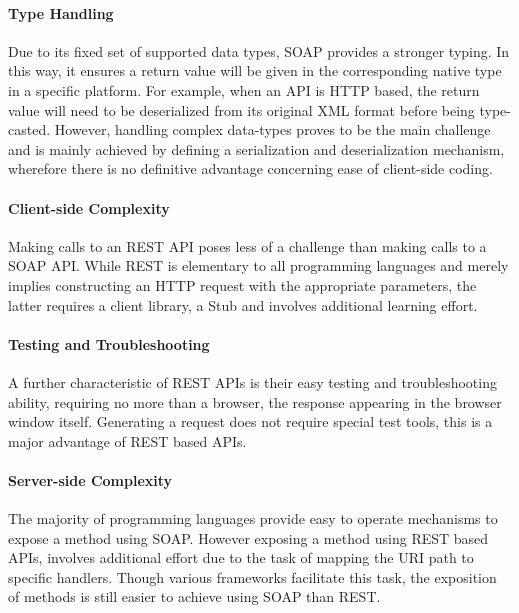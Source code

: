 \paragraph{Type Handling}

Due to its fixed set of supported data types, SOAP provides a stronger typing. In this way, it ensures a return value  will be given in the corresponding native type in a specific platform. For example, when an API is HTTP based, the return value will need to be deserialized from its original XML format before being type-casted.    
However, handling complex data-types proves to be the main challenge and is mainly achieved by defining a serialization and deserialization mechanism, wherefore there is no definitive advantage concerning ease of client-side coding. 


\paragraph{Client-side Complexity}

Making calls to an REST API poses less of a challenge than making calls to a SOAP API. While REST is elementary to all programming languages and merely implies constructing an HTTP request with the appropriate parameters, the latter requires a client library, a Stub and involves additional learning effort.  

\paragraph{Testing and Troubleshooting}

A further characteristic of REST APIs is their easy testing and troubleshooting ability, requiring no more than a browser, the response appearing in the browser window itself. Generating a request does not require special test tools, this is a major advantage of REST based APIs.  
  

\paragraph{Server-side Complexity}

The majority of programming languages provide easy to operate mechanisms to expose a method using SOAP. However exposing a method using REST based APIs, involves additional effort due to the task of mapping the URI path to specific handlers. Though various frameworks facilitate this task, the exposition of methods is still easier to achieve using SOAP than REST.

